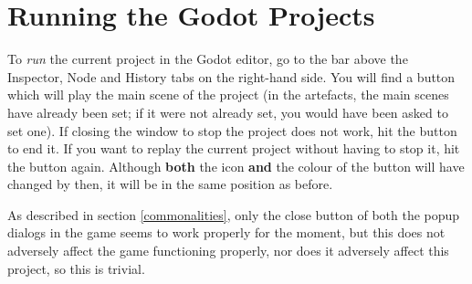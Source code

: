 \newpage

\section{Running the Godot Projects} \label{runproject}

To \textit{run} the current project in the Godot editor, go to the bar above the Inspector, Node and History tabs on the right-hand side. You will find a \faPlay{} button which will play the main scene of the project (in the artefacts, the main scenes have already been set; if it were not already set, you would have been asked to set one). If closing the window to stop the project does not work, hit the \faStop{} button to end it. If you want to replay the current project without having to stop it, hit the \faPlay{} button again. Although \textbf{both} the icon \textbf{and} the colour of the \faPlay{} button will have changed by then, it will be in the same position as before.

As described in section \ref{commonalities}, only the close button of both the popup dialogs in the game seems to work properly for the moment, but this does not adversely affect the game functioning properly, nor does it adversely affect this project, so this is trivial.

